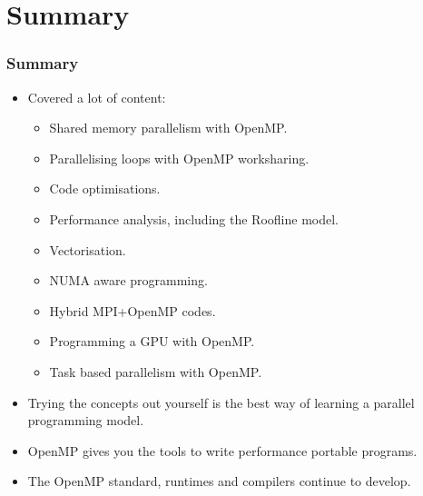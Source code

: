 \documentclass{beamer}
\begin{document}
\section{Summary}
\begin{frame}
\frametitle{Summary}

\begin{itemize}
  \item Covered a lot of content:
    \begin{itemize}
      \item Shared memory parallelism with OpenMP.
      \item Parallelising loops with OpenMP worksharing.
      \item Code optimisations.
      \item Performance analysis, including the Roofline model.
      \item Vectorisation.
      \item NUMA aware programming.
      \item Hybrid MPI+OpenMP codes.
      \item Programming a GPU with OpenMP.
      \item Task based parallelism with OpenMP.
    \end{itemize}

  \item Trying the concepts out yourself is the best way of learning a parallel programming model.

  \item OpenMP gives you the tools to write performance portable programs.

  \item The OpenMP standard, runtimes and compilers continue to develop.

\end{itemize}


\end{frame}

\end{document}
